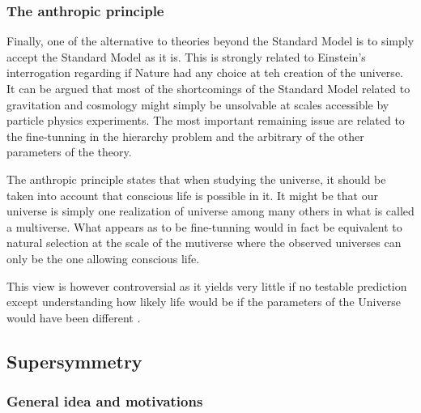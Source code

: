             \subsubsection{The anthropic principle}

        Finally, one of the alternative to theories beyond the Standard Model is to
        simply accept the Standard Model as it is. This is strongly related to Einstein's
        interrogation regarding if Nature had any choice at teh creation of the universe.
        It can be argued that most of the shortcomings of the Standard Model related to
        gravitation and cosmology might simply be unsolvable at scales accessible by
        particle physics experiments. The most important remaining issue are related to the
        fine-tunning in the hierarchy problem and the arbitrary of the other parameters of
        the theory.

        The anthropic principle states that when studying the universe, it
        should be taken into account that conscious life is possible in it. It might be
        that our universe is simply one realization of universe among many others in what
        is called a multiverse. What appears as to be fine-tunning would in fact be
        equivalent to natural selection at the scale of the mutiverse where the observed
        universes can only be the one allowing conscious life.

        This view is however controversial as it yields very little if no testable
        prediction except understanding how likely life would be if the parameters of
        the Universe would have been different .

        \subsection{Supersymmetry}

        \subsubsection{General idea and motivations}

